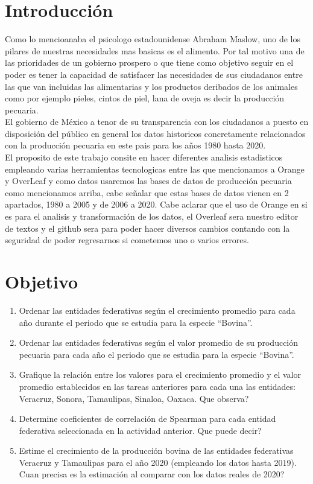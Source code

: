 \documentclass{article}
\begin{document}
\newpage

\section*{\Huge Introducción}
{ \large Como lo mencioanaba el psicologo estadounidense Abraham Maslow, uno de los pilares de nuestras necesidades mas basicas es el alimento. Por tal motivo una de las prioridades de un gobierno prospero o que tiene como objetivo seguir en el poder es tener la capacidad de satisfacer las necesidades de sus ciudadanos entre las que van incluidas las alimentarias y los productos deribados de los animales como por ejemplo pieles, cintos de piel, lana de oveja es decir la producción pecuaria. \\
El gobierno de México a tenor de su transparencia con los ciudadanos a puesto en disposición del público en general los datos historicos concretamente relacionados con la producción pecuaria en este pais para los años 1980 hasta 2020. \\
El proposito de este trabajo consite en hacer diferentes analisis estadisticos empleando varias herramientas tecnologicas entre las que mencionamos a Orange y OverLeaf y como datos usaremos las bases de datos de producción pecuaria como mencionamos arriba, cabe señalar que estas bases de datos vienen en 2 apartados, 1980 a 2005 y de 2006 a 2020.
Cabe aclarar que el uso de Orange en si es para el analisis y transformación de los datos, el Overleaf sera nuestro editor de textos y el github sera para poder hacer diversos cambios contando con la seguridad de poder regresarnos si cometemos uno o varios errores. 

}

\newpage

\section*{\Huge Objetivo}
\vspace{1 cm}
\begin{enumerate}
    \item Ordenar las entidades federativas según el crecimiento promedio para cada año durante el periodo que se estudia para la especie “Bovina”.
    \item Ordenar las entidades federativas según el valor promedio de su producción pecuaria para cada año el periodo que se estudia para la especie “Bovina”.
    \item Grafique la relación entre los valores para el crecimiento promedio y el valor promedio establecidos en las tareas anteriores para cada una las entidades: Veracruz, Sonora, Tamaulipas, Sinaloa, Oaxaca. Que observa?
    \item Determine coeficientes de correlación de Spearman para cada entidad federativa seleccionada en la actividad anterior. Que puede decir?
    \item Estime el crecimiento de la producción bovina de las entidades federativas Veracruz y Tamaulipas para el año 2020 (empleando los datos hasta 2019). Cuan precisa es la estimación al comparar con los datos reales de 2020?
\end{enumerate}
\newpage
\end{document}
